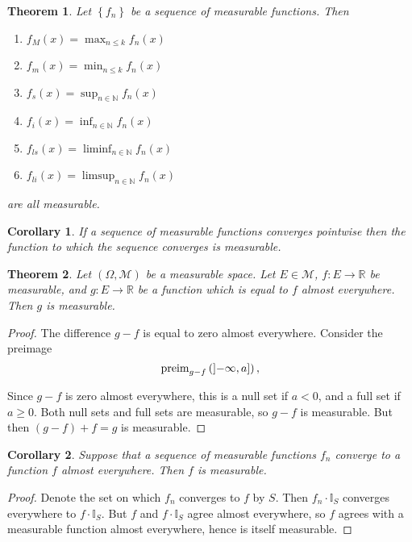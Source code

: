 \documentclass[a4paper]{scrartcl}
\newcommand{\R}{\mathbb{R}}
\newcommand{\N}{\mathbb{N}}
\theoremstyle{definition}
\theoremstyle{plain}
\newtheorem{theorem}{Theorem}[section]
\newtheorem{corollary}{Corollary}[section]
\theoremstyle{remark}
\begin{document}
\begin{theorem}
  \label{thm:limitsoffunctionsaremeasurable}
  Let $\left\{ f_{n} \right\}$ be a sequence of measurable functions. Then
  \begin{enumerate}
    \item $f_{M}(x) = \max_{n \leq k} f_{n}(x)$

    \item $f_{m}(x) = \min_{n \leq k} f_{n}(x)$

    \item $f_{s}(x) = \sup_{n \in \N} f_{n}(x)$

    \item $f_{i}(x) = \inf_{n \in \N} f_{n}(x)$

    \item $f_{ls}(x) = \liminf_{n \in \N} f_{n}(x)$

    \item $f_{li}(x) = \limsup_{n \in \N} f_{n}(x)$
  \end{enumerate}
  are all measurable.
\end{theorem}

\begin{corollary}
  If a sequence of measurable functions converges pointwise then the function to which the sequence converges is measurable.
\end{corollary}

\begin{theorem}
  Let $(\Omega, \mathcal{M})$ be a measurable space. Let $E \in \mathcal{M}$, $f\colon E \to \R$ be measurable, and $g\colon E \to \R$ be a function which is equal to $f$ almost everywhere. Then $g$ is measurable.
\end{theorem}
\begin{proof}
  The difference $g - f$ is equal to zero almost everywhere. Consider the preimage
  \begin{equation*}
  \mathrm{preim}_{g-f}\left( \interval[open left]{-\infty}{a} \right),
\end{equation*}

Since $g - f$ is zero almost everywhere, this is a null set if $a < 0$, and a full set if $a \geq 0$. Both null sets and full sets are measurable, so $g - f$ is measurable. But then $(g - f) + f = g$ is measurable.
\end{proof}

\begin{corollary}
  Suppose that a sequence of measurable functions $f_{n}$ converge to a function $f$ almost everywhere. Then $f$ is measurable.
\end{corollary}
\begin{proof}
  Denote the set on which $f_{n}$ converges to $f$ by $S$. Then $f_{n}\cdot\mathbb{I}_{S}$ converges everywhere to $f\cdot\mathbb{I}_{S}$. But $f$ and $f\cdot \mathbb{I}_{S}$ agree almost everywhere, so $f$ agrees with a measurable function almost everywhere, hence is itself measurable.
\end{proof}
\end{document}
